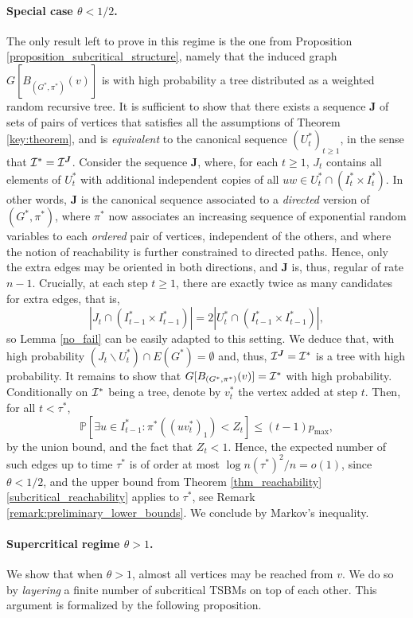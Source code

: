 \documentclass[11pt]{article}
\numberwithin{equation}{section}
\theoremstyle{definition}
\newcommand\bP{{\mathbb P}}
\newcommand\cI{{\cal{I}}}
\begin{document}
\paragraph{Special case $\theta < 1/2$.} The only result left to prove in this regime is the one from Proposition \ref{proposition_subcritical_structure}, namely that the induced graph $G[B_{(G^*,\pi^*)}(v)]$ is with high probability a tree distributed as a weighted random recursive tree. It is sufficient to show that there exists a sequence $\boldsymbol{J}$ of sets of pairs of vertices that satisfies all the assumptions of Theorem \ref{key:theorem}, and is \emph{equivalent} to the canonical sequence $(U^*_t)_{t\geq 1}$, in the sense that $\cI^* = \cI^{\boldsymbol{J}}$. Consider the sequence $\boldsymbol{J}$, where, for each $t \geq 1$, $J_t$ contains all elements of $U^*_t$ with additional independent copies of all $uw \in U^*_t \cap (I^*_t \times I^*_t)$. In other words, $\boldsymbol{J}$ is the canonical sequence associated to a \emph{directed} version of $(G^*,\pi^*)$, where $\pi^*$ now associates an increasing sequence of exponential random variables to each \emph{ordered} pair of vertices, independent of the others, and where the notion of reachability is further constrained to directed paths. Hence, only the extra edges may be oriented in both directions, and $\boldsymbol{J}$ is, thus, regular of rate $n-1$. Crucially, at each step $t\geq 1$, there are exactly twice as many candidates for extra edges, that is,
$$|J_t\cap (I^{*}_{t-1}\times I^*_{t-1})| = 2|U^*_t \cap (I^*_{t-1}\times I^*_{t-1})|,$$
so Lemma \ref{no_fail} can be easily adapted to this setting. We deduce that, with high probability $(J_t \backslash U^*_t)\cap E(G^*) = \emptyset$ and, thus, $\cI^{\boldsymbol{J}}=\cI^*$ is a tree with high probability. It remains to show that $G[B_{(G^*,\pi^*)}(v)] = \cI^*$ with high probability. Conditionally on $\cI^*$ being a tree, denote by $v_t^*$ the vertex added at step $t$. Then, for all $t <\tau^*$,
$$\bP[\exists u\in I^*_{t-1}: \pi^*((uv^*_t)_1)<Z_t] \leq (t-1)p_{\max}, $$
by the union bound, and the fact that $Z_t < 1$. Hence, the expected number of such edges up to time $\tau^*$ is of order at most $\log n(\tau^*)^{2}/n = o(1)$, since $\theta < 1/2$, and the upper bound from Theorem \ref{thm_reachability}\ref{subcritical_reachability} applies to $\tau^*$, see Remark \ref{remark:preliminary_lower_bounds}. We conclude by Markov's inequality.

\paragraph{Supercritical regime $\theta > 1$.} We show that when $\theta>1$, almost all vertices may be reached from $v$. We do so by \emph{layering} a finite number of subcritical TSBMs on top of each other. This argument is formalized by the following proposition.
\end{document}
